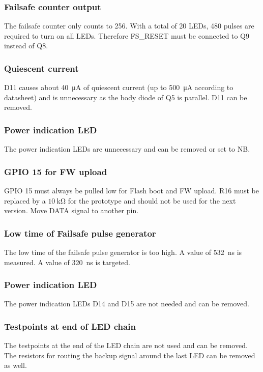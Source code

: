 \subsubsection{Failsafe counter output}
The failsafe counter only counts to 256. With a total of 20 \acp{LED}, 480 pulses are required to turn on all \acp{LED}. Therefore FS\_RESET must be connected to Q9 instead of Q8. 

\subsubsection{Quiescent current}
D11 causes about \qty{40}{\micro\ampere} of quiescent current (up to \qty{500}{\micro\ampere} according to datasheet) and is unnecessary as the body diode of Q5 is parallel. D11 can be removed. 

\subsubsection{Power indication LED}
The power indication \acp{LED} are unnecessary and can be removed or set to NB. 

\subsubsection{GPIO 15 for FW upload}
GPIO 15 must always be pulled low for Flash boot and FW upload. R16 must be replaced by a $\qty{10}{\kilo\ohm}$ for the prototype and should not be used for the next version. Move DATA signal to another pin. 

\subsubsection{Low time of Failsafe pulse generator}
The low time of the failsafe pulse generator is too high. A value of \qty{532}{\nano\s} is measured. A value of \qty{320}{\nano\s} is targeted. 

\subsubsection{Power indication LED}
The power indication \acp{LED} D14 and D15 are not needed and can be removed. 

\subsubsection{Testpoints at end of LED chain}
The testpoints at the end of the \ac{LED} chain are not used and can be removed. The resistors for routing the backup signal around the last LED can be removed as well. 

